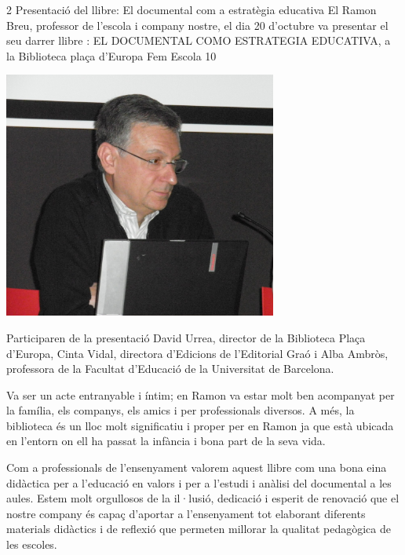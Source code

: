 \begin{news}
{2} %
{Presentació del llibre: El documental com a estratègia educativa}
{El Ramon Breu, professor  de l’escola i company nostre, el dia 20 d’octubre va presentar el seu darrer llibre : EL DOCUMENTAL COMO ESTRATEGIA EDUCATIVA, a la Biblioteca plaça d'Europa}
{Fem Escola}
{10} %

\noindent\includegraphics[width=9cm,keepaspectratio]{fem_escola/img/llibre_PA200015b.jpg}


Participaren de la presentació  David Urrea, director de la Biblioteca Plaça d'Europa, Cinta Vidal, directora d'Edicions de l'Editorial Graó i Alba Ambròs, professora de la Facultat d'Educació de la Universitat de Barcelona.

Va ser un acte entranyable i íntim;  en Ramon va estar molt ben acompanyat per la família, els companys, els  amics i per professionals diversos. 
A més, la biblioteca és un lloc molt significatiu i proper per en Ramon ja que està ubicada en  l’entorn on ell ha passat la infància i bona part de la seva vida.

Com a professionals de l’ensenyament valorem aquest llibre com una bona eina didàctica per a l’educació en valors i per a l’estudi i anàlisi del documental a les aules. Estem molt orgullosos de la il·lusió, dedicació i esperit de renovació que el nostre company és capaç d’aportar a l’ensenyament tot elaborant diferents materials didàctics i de reflexió que permeten millorar la qualitat pedagògica de les escoles. 


\end{news}
